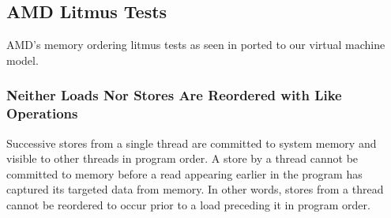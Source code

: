 \newpage

\subsection{AMD Litmus Tests}

\label{appendix:litmus:amd}

AMD's memory ordering litmus tests as seen in \cite[Section 7.2]{ref:AMD} ported to our virtual machine model.

\subsubsection*{Neither Loads Nor Stores Are Reordered with Like Operations}

Successive stores from a single thread are committed to system memory and visible to other threads in program order.
A store by a thread cannot be committed to memory before a read appearing earlier in the program has captured its targeted data from memory.
In other words, stores from a thread cannot be reordered to occur prior to a load preceding it in program order.

\begin{table}[!hbt]
\noindent{}
\caption[Stores Are Not Reordered with Other Stores]{Stores Are Not Reordered with Other Stores \cite[Example 1]{ref:AMD}}
\label{tbl:litmus:amd:1}
\end{table}

